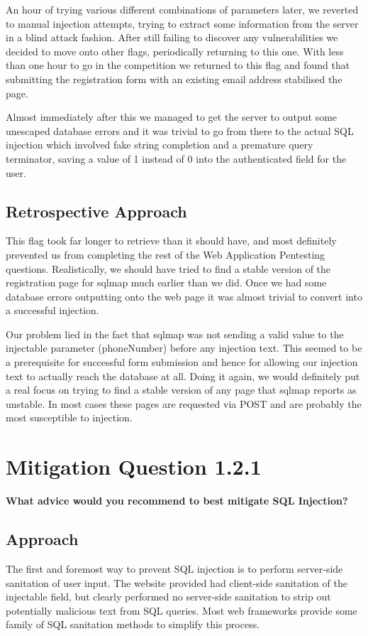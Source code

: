 An hour of trying various different combinations of parameters later, we
reverted to manual injection attempts, trying to extract some information from
the server in a blind attack fashion. After still failing to discover any
vulnerabilities we decided to move onto other flags, periodically returning to
this one. With less than one hour to go in the competition we returned to this
flag and found that submitting the registration form with an existing email
address stabilised the page.

Almost immediately after this we managed to get the server to output some
unescaped database errors and it was trivial to go from there to the actual SQL
injection which involved fake string completion and a premature query
terminator, saving a value of 1 instead of 0 into the authenticated field for
the user.
\subsection{Retrospective Approach}
This flag took far longer to retrieve than it should have, and most definitely
prevented us from completing the rest of the Web Application Pentesting
questions. Realistically, we should have tried to find a stable version of the
registration page for sqlmap much earlier than we did. Once we had some database
errors outputting onto the web page it was almost trivial to convert into a
successful injection.

Our problem lied in the fact that sqlmap was not sending a
valid value to the injectable parameter (phoneNumber) before any injection text.
This seemed to be a prerequisite for successful form submission and hence for
allowing our injection text to actually reach the database at all. Doing it
again, we would definitely put a real focus on trying to find a stable version
of any page that sqlmap reports as unstable. In most cases these pages are
requested via POST and are probably the most susceptible to injection.

\section{Mitigation Question 1.2.1}
\textbf{What advice would you recommend to best mitigate SQL Injection?}
\subsection{Approach}
The first and foremost way to prevent SQL injection is to perform server-side
sanitation of user input. The website provided had client-side sanitation of the
injectable field, but clearly performed no server-side sanitation to strip out
potentially malicious text from SQL queries. Most web frameworks provide some
family of SQL sanitation methods to simplify this process.

